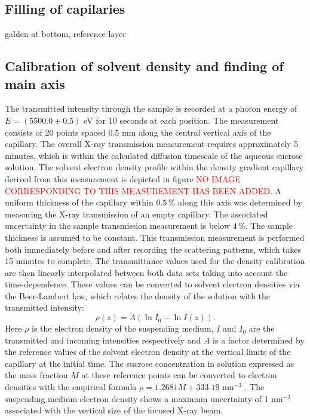 \subsection{Filling of capilaries}
galden at bottom, reference layer


\subsection{Calibration of solvent density and finding of main axis}
The transmitted intensity through the sample is recorded at a photon energy of \(E = (5500.0 \pm  0.5)\) eV for 10 seconds at each position. The measurement consists of 20 points spaced 0.5 mm along the central vertical axis of the capillary. The overall X-ray transmission measurement requires approximately 5 minutes, which is within the calculated diffusion timescale of the aqueous sucrose solution. The solvent electron density profile within the density gradient capillary derived from this measurement is depicted in figure \textcolor{red}{NO IMAGE CORRESPONDING TO THIS MEASUREMENT HAS BEEN ADDED}. A uniform thickness of the capillary within $0.5\,\%$ along this axis was determined by measuring the X-ray transmission of an empty capillary. The associated uncertainty in the sample transmission measurement is below $4\,\%$. The sample thickness is assumed to be constant. This transmission measurement is performed both immediately before and after recording the scattering patterns, which takes 15 minutes to complete. The transmittance values used for the density calibration are then linearly interpolated between both data sets taking into account the time-dependence. These values can be converted to solvent electron densities via the Beer-Lambert law, which relates the density of the solution with the transmitted intensity:
\begin{equation}
  \rho(z) = A \left( \ln{I_0} - \ln{I(z)} \right) .
\end{equation}
Here \(\rho\) is the electron density of the suspending medium, $I$ and $I_0$ are the transmitted and incoming intensities respectively and $A$ is a factor determined by the reference values of the solvent electron density at the vertical limits of the capillary at the initial time. The sucrose concentration in solution expressed as the mass fraction \( M \) at these reference points can be converted to electron densities with the empirical formula \( \rho=1.2681M+333.19 \) nm\(^{-3}\) \citep{haynes_crc_2012}. The suspending medium electron density shows a maximum uncertainty of 1 nm$^{-3}$ associated with the vertical size of the focused X-ray beam.

